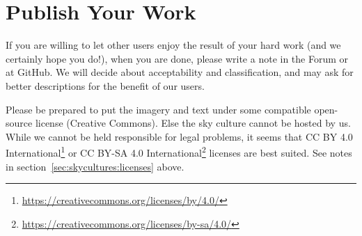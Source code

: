 \section{Publish Your Work}
\label{sec:skyculture:publish}

If you are willing to let other users enjoy the result of your hard
work (and we certainly hope you do!), when you are done, please write
a note in the Forum or at GitHub. We will decide about acceptability
and classification, and may ask for better descriptions for the
benefit of our users.

Please be prepared to put the imagery and text
under some compatible open-source license (Creative Commons).
Else the sky culture cannot be hosted by us.
While we cannot be held responsible for legal problems, it seems that
CC BY 4.0 International\footnote{\url{https://creativecommons.org/licenses/by/4.0/}} or
CC BY-SA 4.0 International\footnote{\url{https://creativecommons.org/licenses/by-sa/4.0/}}
licenses are best suited. See notes in section~\ref{sec:skycultures:licenses} above. 



